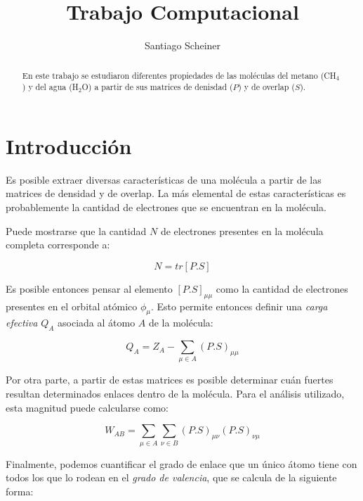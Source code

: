 \documentclass[10pt,a4paper]{article}
\author{Santiago Scheiner}
\title{Trabajo Computacional}
\date{}
\begin{document}
\maketitle

\begin{abstract}

En este trabajo se estudiaron diferentes propiedades de las moléculas del metano (CH$_{4}$) y del agua (H$_{2}$O) a partir de sus matrices de denisdad ($P$) y de overlap ($S$).

\end{abstract}

\section{Introducción}

Es posible extraer diversas características de una molécula a partir de las matrices de densidad y de overlap. La más elemental de estas características es probablemente la cantidad de electrones que se encuentran en la molécula.

Puede mostrarse que la cantidad $N$ de electrones presentes en la molécula completa corresponde a:

\begin{equation}
N = tr[P.S]
\end{equation}



Es posible entonces pensar al elemento $[P.S]_{\mu \mu}$ como la cantidad de electrones presentes en el orbital atómico $\phi_{\mu}$. Esto permite entonces definir una \textit{carga efectiva} $Q_{A}$ asociada al átomo $A$ de la molécula:

\begin{equation}
Q_{A} = Z_{A} - \sum_{\mu \in A} (P.S)_{\mu \mu}
\end{equation}

Por otra parte, a partir de estas matrices es posible determinar cuán fuertes resultan determinados enlaces dentro de la molécula. Para el análisis utilizado, esta magnitud puede calcularse como:

\begin{equation}
W_{AB} = \sum_{\mu \in A} \sum_{\nu \in B} (P.S)_{\mu \nu} (P.S)_{\nu \mu}
\end{equation}

Finalmente, podemos cuantificar el grado de enlace que un único átomo tiene con todos los que lo rodean en el \textit{grado de valencia}, que se calcula de la siguiente forma:
\end{document}
